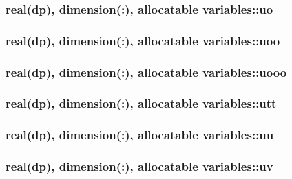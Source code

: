 \hypertarget{classvariables_a70dd065a8048b0abfb87a173dc11fe31}{
\subsubsection[{uo}]{\setlength{\rightskip}{0pt plus 5cm}real(dp), dimension(\-:), allocatable variables\-::uo}}\label{classvariables_a70dd065a8048b0abfb87a173dc11fe31}
\hypertarget{classvariables_aae50fbc08e6752d2b5bd47e821623365}{
\subsubsection[{uoo}]{\setlength{\rightskip}{0pt plus 5cm}real(dp), dimension(\-:), allocatable variables\-::uoo}}\label{classvariables_aae50fbc08e6752d2b5bd47e821623365}
\hypertarget{classvariables_a0adf9388c035f1dd87cb6bad262eec1e}{
\subsubsection[{uooo}]{\setlength{\rightskip}{0pt plus 5cm}real(dp), dimension(\-:), allocatable variables\-::uooo}}\label{classvariables_a0adf9388c035f1dd87cb6bad262eec1e}
\hypertarget{classvariables_a808a247289d7b02f9569e57fa6df3c2b}{
\subsubsection[{utt}]{\setlength{\rightskip}{0pt plus 5cm}real(dp), dimension(\-:), allocatable variables\-::utt}}\label{classvariables_a808a247289d7b02f9569e57fa6df3c2b}
\hypertarget{classvariables_a2bed25657b0c478dee4913e79bcdb3a7}{
\subsubsection[{uu}]{\setlength{\rightskip}{0pt plus 5cm}real(dp), dimension(\-:), allocatable variables\-::uu}}\label{classvariables_a2bed25657b0c478dee4913e79bcdb3a7}
\hypertarget{classvariables_a1be9ac67d728d322ffa4972e03977564}{
\subsubsection[{uv}]{\setlength{\rightskip}{0pt plus 5cm}real(dp), dimension(\-:), allocatable variables\-::uv}}\label{classvariables_a1be9ac67d728d322ffa4972e03977564}
